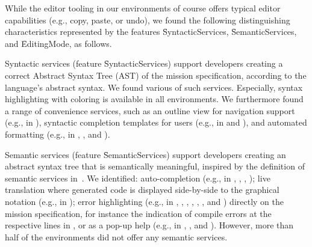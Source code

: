 \newcommand{\fsyntacticservices}{\f{SyntacticServices}}
\newcommand{\fsemanticservices}{\f{SemanticServices}}
\newcommand{\feditingmode}{\f{EditingMode}}

 While the editor tooling in our environments of course offers typical editor capabilities (e.g., copy, paste, or undo), we found the following distinguishing characteristics represented by the features \fsyntacticservices, \fsemanticservices, and \feditingmode, as follows.


Syntactic services (feature \fsyntacticservices) support developers creating a correct Abstract Syntax Tree (AST) of the mission specification, according to the language's abstract syntax. We found various of such services. Especially, syntax highlighting with coloring is available in all environments.  %
We furthermore found a range of convenience services, such as an outline view for navigation support (e.g., in \picaxe), syntactic completion templates for users (e.g., in \edison and \ardublockly), and automated formatting (e.g., in \arcbotics, \robotmesh, and \vex).




Semantic services (feature \fsemanticservices) support developers creating an abstract syntax tree that is semantically meaningful, inspired by the definition of semantic services in~\citet{erdweg2013languageworkbenches}. We identified: auto-completion (e.g., in \vex, \trik, \picaxe, \edison);  live translation where generated code is displayed side-by-side to the graphical notation (e.g., in \easyc); error highlighting (e.g., in \edison, \aseba, \vex, \robotmesh, \blocklyprop, \minibloq, and \easyc) directly on the mission specification, for instance the indication of compile errors at the respective lines in \blocklyprop, or as a pop-up help (e.g., in \edison, \missionlab, and \choregraphe). However, more than half of the environments did not offer any semantic services. %

